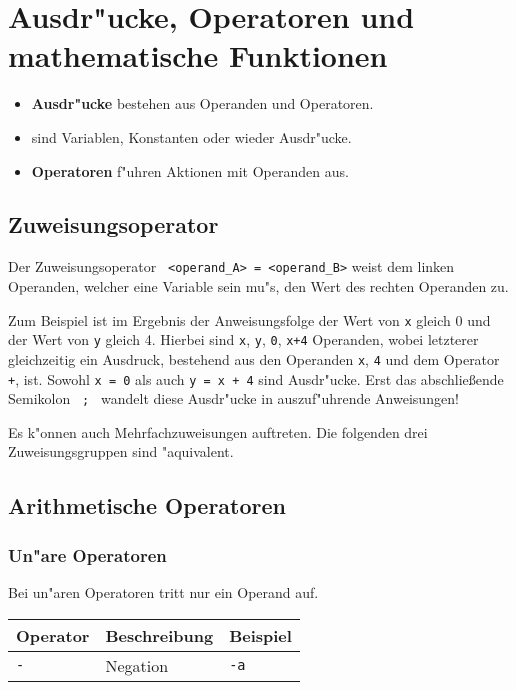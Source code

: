 \chapter[Operatoren]{Ausdr"ucke, Operatoren und mathematische Funktionen}
\label{p:3}
%
\begin{itemize}
 \item \textbf{Ausdr"ucke} bestehen aus Operanden und Operatoren.
 \item \textbf{} sind Variablen, Konstanten oder wieder Ausdr"ucke.
 \item \textbf{Operatoren} f"uhren Aktionen mit Operanden aus.
\end{itemize}
%
%
\section{Zuweisungsoperator}
\label{p:3.1}
%
Der Zuweisungsoperator
\verb| <operand_A> = <operand_B>| weist dem linken Operanden, welcher eine
Variable sein mu"s, den Wert des rechten Operanden zu.

Zum Beispiel ist im Ergebnis der Anweisungsfolge
%
der Wert von \verb|x| gleich 0 und der Wert von \verb|y| gleich 4.
Hierbei sind \verb|x|, \verb|y|,  \verb|0|, \verb|x+4|
Operanden, wobei letzterer gleichzeitig ein Ausdruck, bestehend
aus den Operanden \verb|x|, \verb|4| und dem Operator \verb|+|, ist.
Sowohl \verb|x = 0| als auch \verb|y = x + 4| sind Ausdr"ucke.
Erst das abschlie{\ss}ende Semikolon \verb| ; | wandelt diese Ausdr"ucke
in auszuf"uhrende Anweisungen!

Es k"onnen auch Mehrfachzuweisungen auftreten.
Die folgenden drei Zuweisungsgruppen sind "aquivalent.
%
\section{Arithmetische Operatoren}
\label{p:3.2}
%
\subsection{Un"are Operatoren}
\label{p:3.2.1}
%
Bei un"aren Operatoren tritt nur ein Operand auf.

%
\begin{tabular} {l@{\quad}p{}@{\quad}l}
 Operator & Beschreibung & Beispiel \\ \hline
 \verb|-|	& Negation & \verb|-a|
\end{tabular}
%
%
